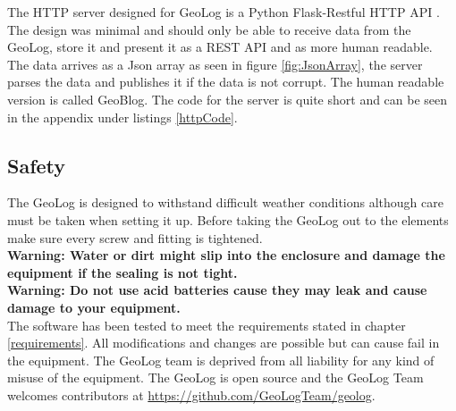 The HTTP server designed for GeoLog is a Python Flask-Restful HTTP API
\cite{flask-restful}. The design was minimal and should only be able to
receive data from the GeoLog, store it and present it as a REST API and as more human
readable. The data arrives as a Json array as seen in figure \ref{fig:JsonArray}, the server parses the data and publishes it if the data is not corrupt. The human readable version is called GeoBlog. The code for the server is quite short and can be seen in the appendix under listings \ref{httpCode}.

\subsection{Safety}
The GeoLog is designed to withstand difficult weather conditions although care must be taken when setting it up. Before taking the GeoLog out to the elements make sure
every screw and fitting is tightened.\\
\textbf{Warning: Water or dirt might slip into the enclosure and damage the equipment if the sealing is not tight.}\\
\textbf{Warning: Do not use acid batteries cause they may leak and cause damage to your equipment.}\\
The software has been tested to meet the requirements stated in chapter 
\ref{requirements}. All modifications and changes are possible but can cause fail
in the equipment.
The GeoLog team is deprived from all liability for any kind of misuse of the 
equipment. The GeoLog is open source and the GeoLog Team welcomes contributors
at \url{https://github.com/GeoLogTeam/geolog}.



